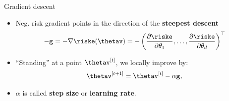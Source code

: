 
\begin{vbframe}{Gradient descent}
  \begin{itemize}
    \item Neg. risk gradient points in the direction of the \textbf{steepest descent}
    $$
    - \mathbf{g} = - \nabla \riske(\thetav) = - \left(\frac{\partial \riske}{\partial \theta_1}, \ldots, \frac{\partial \riske}{\partial \theta_d}\right)^\top
    $$ 

    \item \enquote{Standing} at a point $\thetav^{[t]}$, we locally improve by:
    $$
      \thetav^{[t + 1 ]}  = \thetav^{[t]} - \alpha \mathbf{g},
    $$
    \item $\alpha$ is called \textbf{step size} or \textbf{learning rate}.
  \end{itemize}



\begin{figure}
\centering
{}
\end{figure}
\end{vbframe}
